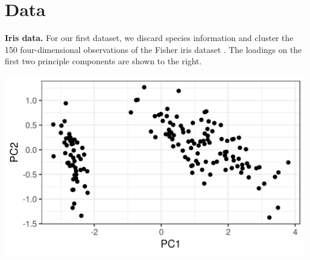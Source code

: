 \documentclass[a0,plainsections,30pt]{sciposter}\usepackage[]{graphicx}\usepackage[]{color}
\newenvironment{knitrout}{}{} %
\begin{document}
\begin{minipage}[t]{0.45\textwidth}
%   
%   

\end{minipage}
\hfill \vrule \hfill
\begin{minipage}[t]{0.45\textwidth}




\section*{Data}
\vspace{-0.3in}
%
\begin{minipage}[t]{0.49\textwidth}
%
\textbf{Iris data.}
For our first dataset, we discard species
information and cluster the 150 four-dimensional observations of the Fisher iris
dataset \citep{iris_data_anderson}.
The loadings on the first two principle components are shown
to the right.
%
\end{minipage}
%
\begin{minipage}[t]{0.49\textwidth}

%
\vspace{-0.4in}
\begin{knitrout}
\color{fgcolor}

{\centering \includegraphics[width=0.98\linewidth,height=0.588\linewidth]{figure/iris_pca-1} 

}
\end{knitrout}
\end{minipage}
\end{minipage}
\end{document}

